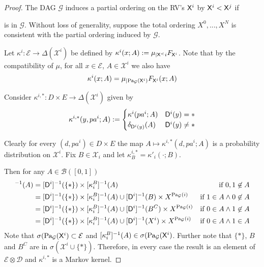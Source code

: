 \begin{proof}
The DAG $\mathcal{G}$ induces a partial ordering on the RV's $\mathsf{X}^i$ by $\mathsf{X}^i < \mathsf{X}^j$ if  is in $\mathcal{G}$. Without loss of generality, suppose the total ordering $X^0,...,X^N$ is consistent with the partial ordering induced by $\mathcal{G}$.

Let $\kappa^i: \mathcal{E}\to \Delta(\mathcal{X}^i)$ be defined by $\kappa^i(x;A) := \mu_{|\mathsf{X}^<i} F_{\mathsf{X}^i}$. Note that by the compatibility of $\mu$, for all $x\in \mathcal{E}$, $A\in \mathcal{X}^i$ we also have
\begin{align}
    \kappa^i(x;A) = \mu_{|\text{Pa}_{\mathcal{G}}(\mathsf{X}^i)} F_{\mathsf{X}^i} (x;A) \label{eq: compatibilty}
\end{align}

Consider $\kappa^{i,*}:D\times E \to \Delta(\mathcal{X}^i)$ given by \begin{align}
    \kappa^{i,*}(y,pa^i;A) := \begin{cases}\kappa^i(pa^i;A) &\mathsf{D}^i(y) = * \\
    \delta_{\mathsf{D}^i(y)}(A) & \mathsf{D}^i(y) \neq *\end{cases}\label{eq:passive}
\end{align}

Clearly for every $(d,pa^i) \in D\times E$ the map $A\mapsto \kappa^{i,*}(d,pa^i;A)$ is a probability distribution on $\mathcal{X}^i$. Fix $B\in\mathcal{X}_i$ and let $\kappa^{i,*}_B=\kappa'_i(\cdot;B)$.

Then for any $A\in \mathcal{B}([0,1])$
\begin{align}
    [\kappa^{i,*}_B]^{-1}(A) &= [\RV{D}^i]^{-1}(\{*\})\times[\kappa^B_i]^{-1}(A) &\text{if }0,1\not\in A\\
    &= [\RV{D}^i]^{-1}(\{*\})\times[\kappa^B_i]^{-1}(A)\cup [\RV{D}^i]^{-1}(B)\times X^{\PA{\mathcal{G}}{i}} &\text{if }1\in A\land 0\not\in A\\
    &= [\RV{D}^i]^{-1}(\{*\})\times[\kappa^B_i]^{-1}(A)\cup [\RV{D}^i]^{-1}(B^C)\times X^{\PA{\mathcal{G}}{i}} &\text{if }0\in A\land 1\not\in A\\
    &= [\RV{D}^i]^{-1}(\{*\})\times[\kappa^B_i]^{-1}(A)\cup [\RV{D}^i]^{-1}(X^i)\times X^{\PA{\mathcal{G}}{i}} &\text{if }0\in A\land 1\in A
\end{align}
Note that $\sigma(\text{Pa}_{\mathcal{G}}(\mathsf{X}^i)\subset\mathcal{E}$ and $[\kappa^B_i]^{-1}(A)\in \sigma(\text{Pa}_{\mathcal{G}}(\mathsf{X}^i)$. Further note that $\{*\}$, $B$ and $B^C$ are in $\sigma(\mathcal{X}^i\cup\{*\})$. Therefore, in every case the result is  an element of $\mathcal{E}\otimes\mathcal{D}$ and $\kappa^{i,*}$ is a Markov kernel.


\end{proof}
